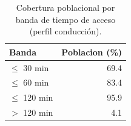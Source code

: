 \begin{table}[htbp]\centering
\caption{Cobertura poblacional por banda de tiempo de acceso (perfil conducci\'on).}\label{tab:cobertura}
\begin{tabular}{lr}
\toprule
Banda & Poblacion (\%) \\
\midrule
$\le$ 30 min & 69.4 \\
$\le$ 60 min & 83.4 \\
$\le$ 120 min & 95.9 \\
$>$ 120 min & 4.1 \\
\bottomrule
\end{tabular}
\end{table}
